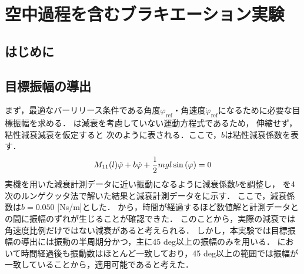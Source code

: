 \chapter[空中過程を含むブラキエーション実験]%
{空中過程を含むブラキエーション実験}
        \section{はじめに}

        \section{目標振幅の導出}
          
        まず，最適なバーリリース条件である角度$\varphi_{\mathrm{ref}}$・角速度$\dot{\varphi}_{\mathrm{ref}}$になるために必要な目標振幅を求める．
        は減衰を考慮していない運動方程式であるため，
        伸縮せず，粘性減衰減衰を仮定すると
        次のように表される．ここで，$b$は粘性減衰係数を表す．
        \begin{eqnarray}
          \equlabel{dampingEquation}
          M_{11}(l)\ddot{\varphi}+b\dot{\varphi}+\frac{1}{2}mgl\sin{(\varphi)}=0          
          \end{eqnarray}
        実機を用いた減衰計測データに近い振動になるように減衰係数$b$を調整し，
        を4次のルンゲクッタ法で解いた結果と減衰計測データをに示す．
        ここで，減衰係数は$b=0.050$ [Ns/m]とした．
        から，時間が経過するほど数値解と計測データとの間に振幅のずれが生じることが確認できた．
        このことから，実際の減衰では角速度比例だけではない減衰があると考えられる．
        しかし，本実験では目標振幅の導出には振動の半周期分かつ，主に45 deg以上の振幅のみを用いる．
        において時間経過後も振動数はほとんど一致しており，45 deg以上の範囲では振幅が一致していることから，適用可能であると考えた．
